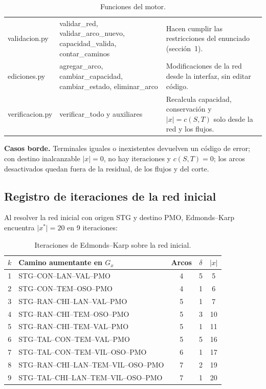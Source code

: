 \documentclass[12pt, a4paper]{article}
\begin{document}
\begin{table}[H]
\begin{tabular}{>{\ttfamily\raggedright\arraybackslash}p{3.0cm}>{\ttfamily\raggedright\arraybackslash}p{4.4cm}p{6.0cm}}
    validacion.py & validar\_red, validar\_arco\_nuevo, capacidad\_valida, contar\_caminos & Hacen cumplir las restricciones del enunciado (sección~1). \\
    ediciones.py & agregar\_arco, cambiar\_capacidad, cambiar\_estado, eliminar\_arco & Modificaciones de la red desde la interfaz, sin editar código. \\
    verificacion.py & verificar\_todo y auxiliares & Recalcula capacidad, conservación y $\lvert x\rvert=c(S,T)$ solo desde la red y los flujos. \\
    \bottomrule
  \end{tabular}
  \caption{Funciones del motor.}
  \label{tab:funciones}
\end{table}

\textbf{Casos borde.} Terminales iguales o inexistentes devuelven un código de error; con destino inalcanzable $\lvert x\rvert = 0$, no hay iteraciones y $c(S,T)=0$; los arcos desactivados quedan fuera de la residual, de los flujos y del corte.

\subsection{Registro de iteraciones de la red inicial}

Al resolver la red inicial con origen STG y destino PMO, Edmonds--Karp encuentra $\lvert x^*\rvert = 20$ en 9 iteraciones:

\begin{table}[H]
  \centering
  \small
  \begin{tabular}{clcc c}
    \toprule
    $k$ & Camino aumentante en $G_x$ & Arcos & $\delta$ & $\lvert x\rvert$ \\
    \midrule
    1 & STG--CON--LAN--VAL--PMO & 4 & 5 & 5 \\
    2 & STG--CON--TEM--OSO--PMO & 4 & 1 & 6 \\
    3 & STG--RAN--CHI--LAN--VAL--PMO & 5 & 1 & 7 \\
    4 & STG--RAN--CHI--TEM--OSO--PMO & 5 & 3 & 10 \\
    5 & STG--RAN--CHI--TEM--VAL--PMO & 5 & 1 & 11 \\
    6 & STG--TAL--CON--TEM--VAL--PMO & 5 & 5 & 16 \\
    7 & STG--TAL--CON--TEM--VIL--OSO--PMO & 6 & 1 & 17 \\
    8 & STG--RAN--CHI--LAN--TEM--VIL--OSO--PMO & 7 & 2 & 19 \\
    9 & STG--TAL--CHI--LAN--TEM--VIL--OSO--PMO & 7 & 1 & 20 \\
    \bottomrule
  \end{tabular}
  \caption{Iteraciones de Edmonds--Karp sobre la red inicial.}
  \label{tab:iteraciones}
\end{table}
\end{document}
